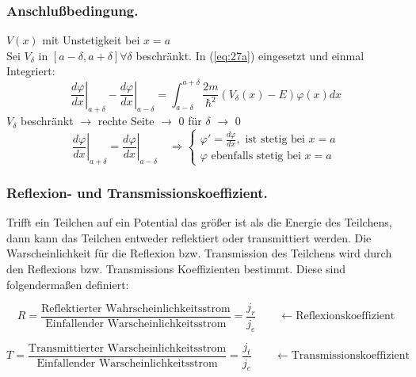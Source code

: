 \subsubsection{Anschlußbedingung.}
$V(x)$ mit Unstetigkeit bei $x=a$\\
Sei $V_\delta$ in $[a-\delta, a+\delta] \forall \delta$ beschränkt. In
(\ref{eq:27a}) eingesetzt und einmal Integriert:
\begin{equation*}
  \left. \frac{d\varphi}{dx}\right|_{a+\delta}-\left. \frac{d\varphi}{dx}\right|_{a-\delta} =
\int_{a-\delta}^{a+\delta} \frac{2m}{\hbar^2}
\left(V_\delta(x)-E\right)\varphi(x)dx
\end{equation*}
$V_\delta$ beschränkt $\rightarrow$ rechte Seite $\rightarrow$ 0 für $\delta$
$\rightarrow$ 0
\begin{equation*}
  \left. \frac{d\varphi}{dx}\right|_{a+\delta} = \left.
    \frac{d\varphi}{dx}\right|_{a-\delta} \quad
  \Rightarrow
 \begin{cases} 
   \varphi'=\frac{d\varphi}{dx}, \mbox{ ist stetig bei } x=a  \\
   \varphi \mbox{ ebenfalls stetig bei } x=a 
 \end{cases}
\end{equation*}


\subsubsection{Reflexion- und Transmissionskoeffizient.}

Trifft ein Teilchen auf ein Potential das größer ist als die Energie des Teilchens, dann kann das Teilchen entweder reflektiert oder transmittiert werden. Die Warscheinlichkeit für die Reflexion bzw. Transmission des Teilchens wird durch den Reflexions bzw. Transmissions Koeffizienten bestimmt. Diese sind folgendermaßen definiert:

\begin{equation}
  \label{eq:1}
  R = \frac{\text{Reflektierter Wahrscheinlichkeitsstrom}}{\text{Einfallender Warscheinlichkeitsstrom}}  = \frac{j_{r}}{j_{e}}\qquad \leftarrow  \text{Reflexionskoeffizient}
\end{equation}

\begin{equation}
  \label{eq:2}
  T = \frac{\text{Transmittierter Warscheinlichkeitsstrom}}{\text{Einfallender Warscheinlichkeitsstrom}}  = \frac{j_{t}}{j_{e}}\qquad \leftarrow  \text{Transmissionskoeffizient}
\end{equation}



